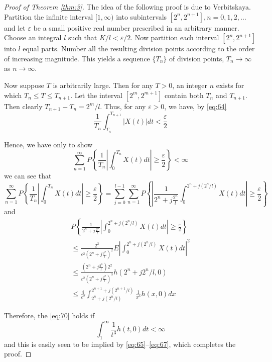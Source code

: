 \documentclass{article}
\begin{document}
\begin{proof}[Proof of Theorem \ref{thm:3}]
The idea of the following proof is due to Verbitskaya. Partition the infinite interval $[1, \infty)$ into subintervals $[2^{n}, 2^{n+1}], n=0,1,2, \ldots$ and let $\varepsilon$ be a small positive real number prescribed in an arbitrary manner. Choose an integral $l$ such that $K/l < \varepsilon/2$. Now partition each interval $[2^{n}, 2^{n+1}]$ into $l$ equal parts. Number all the resulting division points according to the order of increasing magnitude. This yields a sequence $\{T_{n}\}$ of division points, $T_{n} \rightarrow \infty$ as $n \rightarrow \infty$.

Now suppose $T$ is arbitrarily large. Then for any $T>0$, an integer $n$ exists for which $T_{n} \leq T \leq T_{n+1}$. Let the interval $[2^{m}, 2^{m+1}]$ contain both $T_{n}$ and $T_{n+1}$. Then clearly $T_{n+1}-T_{n}=2^{m}/l$. Thus, for any $\varepsilon>0$, we have, by \eqref{eq:64}
\begin{equation}\label{eq:69}
\frac{1}{T_{n}} \int_{T_{n}}^{T_{n+1}}|X(t)| dt<\frac{\varepsilon}{2}
\end{equation}

Hence, we have only to show
\begin{equation}\label{eq:70}
\sum_{n=1}^{\infty} P\left\{\frac{1}{T_{n}}\left|\int_{0}^{T_{n}} X(t) dt\right| \geq \frac{\varepsilon}{2}\right\}<\infty
\end{equation}
we can see that
\begin{equation}\label{eq:71}
\sum_{n=1}^{\infty} P\left\{\frac{1}{T_{n}}\left|\int_{0}^{T_{n}} X(t) dt\right| \geq \frac{\varepsilon}{2}\right\} = \sum_{j=0}^{l-1} \sum_{n=1}^{\infty} P\left\{\left|\frac{1}{2^{n}+j\frac{2^{n}}{l}} \int_{0}^{2^{n}+j(2^{n}/l)} X(t) dt\right| \geq \frac{\varepsilon}{2}\right\}
\end{equation}
and
\begin{equation}\label{eq:72}
\begin{split}
P\left\{\frac{1}{2^{n}+j\frac{2^{n}}{l}}\left|\int_{0}^{2^{n}+j(2^{n}/l)} X(t) dt\right| \geq \frac{\varepsilon}{2}\right\}\\
\leq \frac{2^{2}}{\varepsilon^{2}(2^{n}+j\frac{2^{n}}{l})^{2}} E\left|\int_{0}^{2^{n}+j(2^{n}/l)} X(t) dt\right|^{2}\\
\leq \frac{(2^{n}+j\frac{2^{n}}{l})2^{2}}{\varepsilon^{2}(2^{n}+j\frac{2^{n}}{l})^{3}} h(2^{n}+j2^{n}/l, 0)\\
\leq \frac{4}{\varepsilon^{2}} \int_{2^{n}+j(2^{n}/l)}^{2^{n+1}+j(2^{n+1}/l)} \frac{1}{x^{3}} h(x, 0) dx
\end{split}
\end{equation}

Therefore, the \eqref{eq:70} holds if
\begin{equation}\label{eq:73}
\int_{1}^{\infty} \frac{1}{t^{3}} h(t, 0) dt<\infty
\end{equation}
and this is easily seen to be implied by \eqref{eq:65}--\eqref{eq:67}, which completes the proof.
\end{proof}
\end{document}
